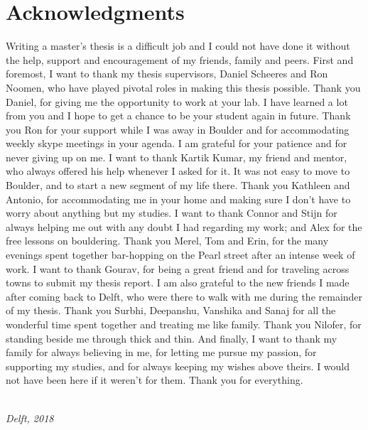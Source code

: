 \chapter*{Acknowledgments}

Writing a master's thesis is a difficult job and I could not have done it without the help, support and encouragement of my friends, family and peers. First and foremost, I want to thank my thesis supervisors, Daniel Scheeres and Ron Noomen, who have played pivotal roles in making this thesis possible. Thank you Daniel, for giving me the opportunity to work at your lab. I have learned a lot from you and I hope to get a chance to be your student again in future. Thank you Ron for your support while I was away in Boulder and for accommodating weekly skype meetings in your agenda. I am grateful for your patience and for never giving up on me. I want to thank Kartik Kumar, my friend and mentor, who always offered his help whenever I asked for it.
\newline\newline
It was not easy to move to Boulder, and to start a new segment of my life there. Thank you Kathleen and Antonio, for accommodating me in your home and making sure I don't have to worry about anything but my studies. I want to thank Connor and Stijn for always helping me out with any doubt I had regarding my work; and Alex for the free lessons on bouldering. Thank you Merel, Tom and Erin, for the many evenings spent together bar-hopping on the Pearl street after an intense week of work.
\newline\newline
I want to thank Gourav, for being a great friend and for traveling across towns to submit my thesis report. I am also grateful to the new friends I made after coming back to Delft, who were there to walk with me during the remainder of my thesis. Thank you Surbhi, Deepanshu, Vanshika and Sanaj for all the wonderful time spent together and treating me like family. Thank you Nilofer, for standing beside me through thick and thin.
\newline\newline
And finally, I want to thank my family for always believing in me, for letting me pursue my passion, for supporting my studies, and for always keeping my wishes above theirs. I would not have been here if it weren't for them. Thank you for everything.

\begin{flushright}
{\makeatletter\itshape
    \@author \\
    Delft, 2018
\makeatother}
\end{flushright}
